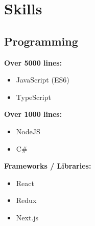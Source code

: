 \documentclass[letterpaper]{deedy-resume} %
\begin{document}
\begin{minipage}[t]{0.33\textwidth} %







\section{Skills}

\subsection{Programming}



\textbf{Over 5000 lines:}
\begin{itemize}
    \setlength\itemsep{-0.5em} %
    \item JavaScript (ES6)
    \item TypeScript
\end{itemize}


\vspace{-\topsep}



\textbf{Over 1000 lines:}
\vspace{-\topsep}
\begin{itemize}
    \setlength\itemsep{-0.5em} %
    \item NodeJS
    \item C\#
\end{itemize}



\vspace{-\topsep}



\textbf{Frameworks / Libraries:}
\vspace{-\topsep}
\begin{itemize}
    \setlength\itemsep{-0.5em} %
    \item React
    \item Redux
    \item Next.js
\end{itemize}


\end{minipage}
\end{document}
